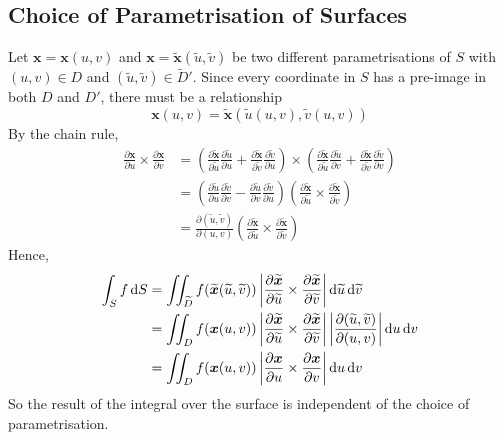 \documentclass{article}
\begin{document}
\subsection{Choice of Parametrisation of Surfaces}
Let $\bm x = \bm x(u, v)$ and $\bm x = \widetilde {\bm x} (\widetilde u, \widetilde v)$ be two different parametrisations of $S$ with $(u, v) \in D$ and $(\widetilde u, \widetilde v) \in \widetilde D'$. Since every coordinate in $S$ has a pre-image in both $D$ and $D'$, there must be a relationship
\[ \bm x(u, v) = \widetilde {\bm x} (\widetilde u(u, v), \widetilde v(u, v)) \]
By the chain rule,
\begin{align*}
    \frac{\partial \bm x}{\partial u} \times \frac{\partial \bm x}{\partial v} & = \left( \frac{\partial \widetilde {\bm x}}{\partial \widetilde u}\frac{\partial \widetilde u}{\partial u} + \frac{\partial \widetilde {\bm x}}{\partial \widetilde v}\frac{\partial \widetilde v}{\partial u} \right) \times \left( \frac{\partial \widetilde {\bm x}}{\partial \widetilde u}\frac{\partial \widetilde u}{\partial v} + \frac{\partial \widetilde {\bm x}}{\partial \widetilde v}\frac{\partial \widetilde v}{\partial v} \right) \\
                                                                               & = \left( \frac{\partial \widetilde u}{\partial u}\frac{\partial \widetilde v}{\partial v} - \frac{\partial \widetilde u}{\partial v}\frac{\partial \widetilde v}{\partial u} \right) \left( \frac{\partial \widetilde {\bm x}}{\partial \widetilde u}\times\frac{\partial \widetilde {\bm x}}{\partial \widetilde v} \right)                                                                                                                       \\
                                                                               & = \frac{\partial (\widetilde u, \widetilde v)}{\partial (u, v)} \left( \frac{\partial \widetilde {\bm x}}{\partial \widetilde u}\times\frac{\partial \widetilde {\bm x}}{\partial \widetilde v} \right)
\end{align*}
Hence,
\begin{align*}
    \int_S f \,\dd S & = \iint_{\widetilde D} f(\widetilde {\bm x}(\widetilde u, \widetilde v)) \,\abs{\frac{\partial \widetilde {\bm x}}{\partial \widetilde u}\times\frac{\partial \widetilde {\bm x}}{\partial \widetilde v}}\,\dd \widetilde u\,\dd \widetilde v \\
                     & = \iint_D f(\bm x(u, v)) \,\abs{\frac{\partial \widetilde {\bm x}}{\partial \widetilde u}\times\frac{\partial \widetilde {\bm x}}{\partial \widetilde v}}\,\abs{\frac{\partial (\widetilde u, \widetilde v)}{\partial (u, v)}}\,\dd u\,\dd v  \\
                     & = \iint_D f(\bm x(u, v)) \,\abs{\frac{\partial \bm x}{\partial u}\times\frac{\partial \bm x}{\partial v}}\,\dd u\,\dd v                                                                                                                       \\
\end{align*}
So the result of the integral over the surface is independent of the choice of parametrisation.
\end{document}
